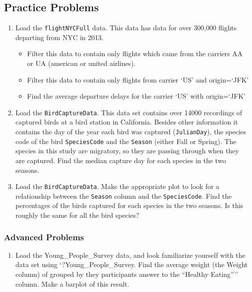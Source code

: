 \documentclass[
]{book}
\providecommand{\tightlist}{%
  \setlength{\itemsep}{0pt}\setlength{\parskip}{0pt}}
\theoremstyle{definition}
\theoremstyle{definition}
\theoremstyle{definition}
\theoremstyle{definition}
\theoremstyle{remark}
\begin{document}
\hypertarget{practice-problems-2}{%
\subsection{Practice Problems}\label{practice-problems-2}}

\begin{enumerate}
\def\labelenumi{\arabic{enumi}.}
\item
  Load the \texttt{flightNYCFull} data. This data has data for over 300,000 flights departing from NYC in 2013.

  \begin{itemize}
  \tightlist
  \item
    Filter this data to contain only flights which came from the carriers AA or UA (american or united airlines).
  \item
    Filter this data to contain only flights from carrier `US' and origin=`JFK'
  \item
    Find the average departure delays for the carrier `US' with origin=`JFK'
  \end{itemize}
\item
  Load the \texttt{BirdCaptureData}. This data set contains over 14000 recordings of captured birds at a bird station in California. Besides other information it contains the day of the year each bird was captured (\texttt{JulianDay}), the species code of the bird \texttt{SpeciesCode} and the \texttt{Season} (either Fall or Spring). The species in this study are migratory, so they are passing through when they are captured. Find the median capture day for each species in the two seasons.
\item
  Load the \texttt{BirdCaptureData}. Make the appropriate plot to look for a relationship between the \texttt{Season} column and the \texttt{SpeciesCode}. Find the percentages of the birds captured for each species in the two seasons. Is this roughly the same for all the bird species?
\end{enumerate}

\hypertarget{advanced-problems-2}{%
\subsubsection{Advanced Problems}\label{advanced-problems-2}}

\begin{enumerate}
\def\labelenumi{\arabic{enumi}.}
\tightlist
\item
  Load the Young\_People\_Survey data, and look familiarize yourself with the data set using `?Young\_People\_Survey. Find the average weight (the Weight column) of grouped by they participants answer to the ``Healthy Eating'''' column. Make a barplot of this result.
\end{enumerate}
\end{document}

